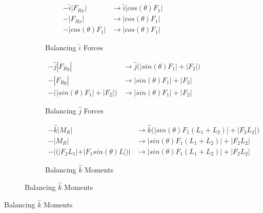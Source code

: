 \documentclass[12pt]{article}
\begin{document}
\begin{figure}[H]
\begin{subfigure}[H]{\textwidth}
    \begin{subfigure}[H]{0.45\textwidth}
      \centering
      \begin{align*}
        -\hat{i}|F_{Rx}|  &\rightarrow \hat{i}|cos(\theta)F_1| \\
        -|F_{Rx}|         &\rightarrow |cos(\theta)F_1| \\
        -|cos(\theta)F_1| &\rightarrow |cos(\theta)F_1|
      \end{align*}
      \caption{Balancing $\hat{i}$ Forces}
      \label{onetwothree}
    \end{subfigure}
    \centering
    \begin{subfigure}[H]{0.45\textwidth}
      \begin{align*}
        -\hat{j}|F_{Ry}|                    &\rightarrow \hat{j}\big(|sin(\theta)F_1| + |F_2|\big) \\
        -|F_{Ry}|                           &\rightarrow |sin(\theta)F_1| + |F_2| \\
        -\big(|sin(\theta)F_1| + |F_2|\big) &\rightarrow |sin(\theta)F_1| + |F_2|
      \end{align*}
      \caption{Balancing $\hat{j}$ Forces}
      \label{onetwfw}
    \end{subfigure}
    \begin{subfigure}[H]{\textwidth}
      \centering
      \begin{align*}
        -\hat{k}|M_{R}|                            &\rightarrow \hat{k}\big(|sin(\theta)F_1(L_1+L_2)| + |F_2L_2|\big) \\
        -|M_{R}|                                   &\rightarrow |sin(\theta)F_1(L_1+L_2)| + |F_2L_2| \\
        -|\big(|F_2L_1| + |F_1sin(\theta)L|\big)|  &\rightarrow |sin(\theta)F_1(L_1+L_2)| + |F_2L_2|
      \end{align*}
      \caption{Balancing $\hat{k}$ Moments}
      \label{onetwoth}
    \end{subfigure}
  \end{subfigure}
\end{figure}
\end{document}
